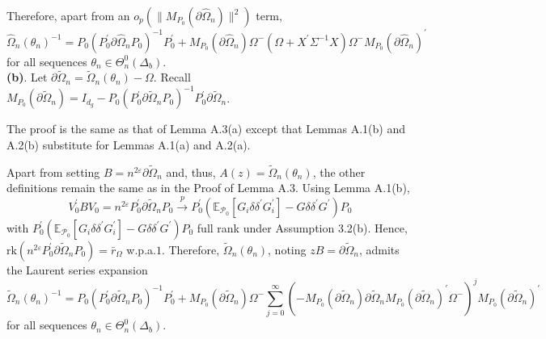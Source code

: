 \documentclass[hidelinks, 11 pt, a4paper, pdflatex]{article}
\begin{document}
{   Therefore, apart from an $o_{p}(\|M_{P_{0}}(\partial \hat{\Omega}_{n})\|^{2})$ term,
    \[
     \hat{\Omega}_{n}(\theta _{n})^{-1} = P_{0}(P_{0}^{\prime}\partial \hat{\Omega}_{n}P_{0})^{-1}P_{0}^{\prime}
                                           + M_{P_{0}}(\partial \hat{\Omega}_{n})\Omega^{-}
                                            (\Omega + X^{\prime}\Sigma^{-1}X)\Omega^{-}M_{P_{0}}(\partial \hat{\Omega}_{n})^{\prime}
    \]
   for all sequences $\theta_{n} \in \Theta_{n}^{0}(\Delta_{b})$. \\

   \textbf{(b)}. Let $\partial \tilde{\Omega}_{n} = \tilde{\Omega}_{n}(\theta_{n}) - \Omega$. Recall $M_{P_{0}}(\partial
    \tilde{\Omega}_{n}) = I_{d_{g}} - P_{0}(P_{0}^{\prime}\partial \tilde{\Omega}_{n}P_{0})^{-1} P_{0}^{\prime}\partial \tilde{\Omega}_{n}$. 
    
    The proof is the same as that of Lemma A.3(a) except that Lemmas A.1(b) and A.2(b) substitute for Lemmas A.1(a) and A.2(a).

    Apart from setting $B = n^{2\varepsilon}\partial \tilde{\Omega}_{n}$ and, thus, $A(z) = \tilde{\Omega}_{n}(\theta_{n})$, the other definitions remain the same as in the Proof of Lemma A.3. Using Lemma A.1(b),
     \[
      V_{0}^{\prime}BV_{0} = n^{2\varepsilon}P_{0}^{\prime}\partial \tilde{\Omega}_{n}P_{0}
                              \overset{p} {\rightarrow}
                              P_{0}^{\prime}(\mathbb{E}_{\mathcal{P}_{0}}[G_{i}\delta \delta^{\prime}G_{i}^{\prime}] - G\delta \delta^{\prime}G^{\prime})P_{0}
     \]
    with $P_{0}^{\prime}(\mathbb{E}_{\mathcal{P}_{0}}[G_{i}\delta \delta^{\prime}G_{i}^{\prime}] - G\delta \delta^{\prime}G^{\prime})P_{0}$ full rank under Assumption 3.2(b). Hence, $\mathrm{rk}(n^{2\varepsilon}P_{0}^{\prime} \partial \tilde{\Omega}_{n}P_{0}) = \bar{r}_{\Omega}$ w.p.a.$1$. Therefore, $\tilde{\Omega}_{n}(\theta_{n})$, noting $zB = \partial \tilde{\Omega}_{n}$, admits the Laurent series expansion
     \[
      \tilde{\Omega}_{n}(\theta _{n})^{-1} = P_{0}(P_{0}^{\prime }\partial \tilde{\Omega}_{n}P_{0})^{-1}P_{0}^{\prime}
                                             + M_{P_{0}}(\partial \tilde{\Omega}_{n})\Omega^{-}
                                               \sum_{j=0}^{\infty}
                                                (- M_{P_{0}}(\partial \tilde{\Omega}_{n})\partial \tilde{\Omega}_{n}M_{P_{0}}(\partial \tilde{\Omega}_{n})^{\prime}\Omega^{-})^{j}
                                               M_{P_{0}}(\partial \tilde{\Omega}_{n})^{\prime}
     \]
    for all sequences $\theta_{n} \in \Theta_{n}^{0}(\Delta_{b})$.

}
\end{document}
